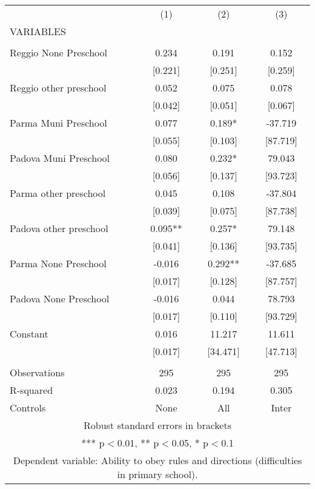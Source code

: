 \begin{tabular}{lccc} \hline
 & (1) & (2) & (3) \\
VARIABLES &  &  &  \\ \hline
 &  &  &  \\
Reggio None Preschool & 0.234 & 0.191 & 0.152 \\
 & [0.221] & [0.251] & [0.259] \\
Reggio other preschool & 0.052 & 0.075 & 0.078 \\
 & [0.042] & [0.051] & [0.067] \\
Parma Muni Preschool & 0.077 & 0.189* & -37.719 \\
 & [0.055] & [0.103] & [87.719] \\
Padova Muni Preschool & 0.080 & 0.232* & 79.043 \\
 & [0.056] & [0.137] & [93.723] \\
Parma other preschool & 0.045 & 0.108 & -37.804 \\
 & [0.039] & [0.075] & [87.738] \\
Padova other preschool & 0.095** & 0.257* & 79.148 \\
 & [0.041] & [0.136] & [93.735] \\
Parma None Preschool & -0.016 & 0.292** & -37.685 \\
 & [0.017] & [0.128] & [87.757] \\
Padova None Preschool & -0.016 & 0.044 & 78.793 \\
 & [0.017] & [0.110] & [93.729] \\
Constant & 0.016 & 11.217 & 11.611 \\
 & [0.017] & [34.471] & [47.713] \\
 &  &  &  \\
Observations & 295 & 295 & 295 \\
R-squared & 0.023 & 0.194 & 0.305 \\
 Controls & None & All & Inter \\ \hline
\multicolumn{4}{c}{ Robust standard errors in brackets} \\
\multicolumn{4}{c}{ *** p$<$0.01, ** p$<$0.05, * p$<$0.1} \\
\multicolumn{4}{c}{ Dependent variable: Ability to obey rules and directions (difficulties in primary school).} \\
\end{tabular}

